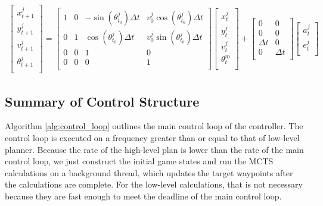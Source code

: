 \begin{multline} \label{eq:lqng_dyn}
\begin{bmatrix}
x^j_{t+1} \\
y^j_{t+1} \\
v^j_{t+1} \\
\theta^j_{t+1} \\
\end{bmatrix} = 
\begin{bmatrix} 
	1 & 0 & -\sin(\theta^j_{t_0})\Delta t & v^j_0\cos(\theta^j_{t_0})\Delta t\\
	0 & 1 & \cos(\theta^j_{t_0})\Delta t & v^j_0\sin(\theta^j_{t_0})\Delta t\\
	0 & 0 & 1 & 0\\
	0 & 0 & 0 & 1\\
	\end{bmatrix}
\begin{bmatrix}
x^j_{t} \\
y^j_{t} \\
v^j_{t} \\
\theta^m_{t} \\
\end{bmatrix}  +
\begin{bmatrix} 
	0 & 0 \\
	0 & 0 \\
	\Delta t & 0 \\
	0 & \Delta t \\
	\end{bmatrix}
	\begin{bmatrix} 
	a^j_t  \\
	e^j_t \\
	\end{bmatrix}
\end{multline}

\subsection{Summary of Control Structure}
Algorithm \ref{alg:control_loop} outlines the main control loop of the controller. The control loop is executed on a frequency greater than or equal to that of low-level planner. Because the rate of the high-level plan is lower than the rate of the main control loop, we just construct the initial game states and run the MCTS calculations on a background thread, which updates the target waypoints after the calculations are complete. For the low-level calculations, that is not necessary because they are fast enough to meet the deadline of the main control loop. 

